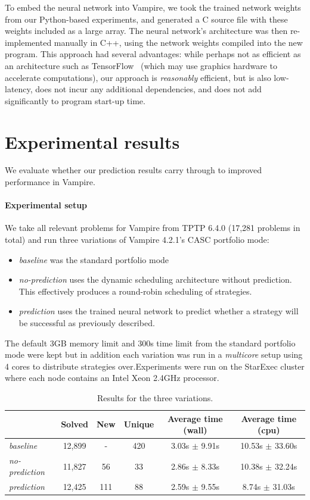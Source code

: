 \documentclass{llncs}
\begin{document}
To embed the neural network into Vampire, we took the trained network weights from our Python-based experiments, and generated a C source file with these weights included as a large array.
The neural network's architecture was then re-implemented manually in C++, using the network weights compiled into the new program.
This approach had several advantages: while perhaps not as efficient as an architecture such as TensorFlow~\cite{tensorflow} (which may use graphics hardware to accelerate computations), our approach is \emph{reasonably} efficient, but is also low-latency, does not incur any additional dependencies, and does not add significantly to program start-up time.

\section{Experimental results} \label{sec:experiments}

We evaluate whether our prediction results carry through to improved performance in Vampire.

\paragraph{Experimental setup} We take all relevant problems for Vampire from TPTP 6.4.0 (17,281 problems in total) and run three variations of Vampire 4.2.1's CASC portfolio mode:
\begin{itemize}
	\item \emph{baseline} was the standard portfolio mode
	\item \emph{no-prediction} uses the dynamic scheduling architecture without prediction. This effectively produces a round-robin scheduling of strategies.
	\item \emph{prediction} uses the trained neural network to predict whether a strategy will be successful as previously described.
\end{itemize}	
The default 3GB memory limit and 300s time limit from the standard portfolio mode were kept but in addition each variation was run in a \emph{multicore} setup using 4 cores to distribute strategies over.Experiments were run on the StarExec cluster \cite{starexec} where each node contains an Intel Xeon 2.4GHz processor. 

\begin{table}[t]
\caption{Results for the three variations.\label{tab:numbers}}
\centering
\begin{tabular}{l|ccccc}
				& Solved & New & Unique & Average time (wall) & Average time (cpu) \\ \hline
\emph{baseline}		& 12,899 &- & 420 & 3.03s $\pm$ 9.91s &10.53s $\pm$ 33.60s\\
\emph{no-prediction}	& 11,827 & 56& 33 & 2.86s $\pm$ 8.33s&10.38s $\pm$ 32.24s\\
\emph{prediction} 	& 12,425 & 111& 88 &2.59s $\pm$ 9.55s & 8.74s $\pm$ 31.03s \\
\end{tabular}
\end{table}
\end{document}
